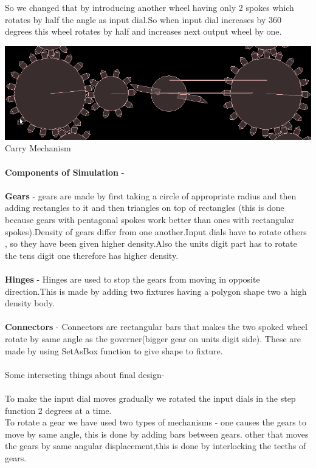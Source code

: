 \documentclass[11pt]{article}
\begin{document}
So we changed that by introducing another wheel having only 2 spokes which rotates by half the angle as input dial.So when input dial increases by 360 degrees this wheel rotates by half and increases next output wheel by one.

\includegraphics[scale=0.45]{../images/CarryMechanism.png} 
\\
Carry Mechanism
\\
\\
\textbf{Components of Simulation} -
\\
\\
\textbf{Gears} - gears are made by first taking a circle of appropriate radius and then adding rectangles to  it and then triangles on top of rectangles (this is done because gears with pentagonal spokes work better than ones with rectangular spokes).Density of gears differ from one another.Input dials have to rotate others , so they have been given higher density.Also the units digit part has to rotate the tens digit one therefore has higher density.
\\
\\
\textbf{Hinges} - Hinges are used to stop the gears from moving in opposite direction.This is made by adding two fixtures having a polygon shape two a high density body.
\\
\\
\textbf{Connectors} - Connectors are rectangular bars that makes the two spoked wheel rotate by same angle as the governer(bigger gear on units digit side).
These are made by using SetAsBox function  to give shape to fixture.
\\
\\
Some interseting things about final design-
\\
\\
To make the input dial moves gradually we rotated the input dials in the   step function 2 degrees at a time.
\\
To rotate a gear we have used two types of mechanisms - 
one causes  the gears to move by same angle, this is done by adding bars between gears.   
other that moves the gears by same angular displacement,this is done by interlocking the teeths of gears.
\end{document}
